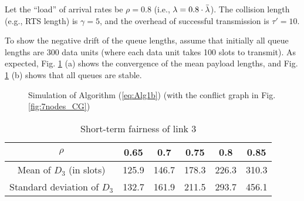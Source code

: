 \documentclass{IEEEtran}
\providecommand{\tabularnewline}{\\}
\begin{document}
Let the {}``load'' of arrival rates be $\rho=0.8$ (i.e., ${\bf \lambda}=0.8\cdot\bar{{\bf \lambda}}$).
The collision length (e.g., RTS length) is $\gamma=5$, and the overhead
of successful transmission is $\tau'=10$. \begin{comment}
It can be verified that ${\bf \lambda}\in{\cal C}'([r_{min},r_{max}],\epsilon)$. 
\end{comment}
{}To show the negative drift of the queue lengths, assume that initially
all queue lengths are 300 data units (where each data unit takes 100
slots to transmit). As expected, Fig. \ref{fig:Alg1} (a) shows the
convergence of the mean payload lengths, and Fig. \ref{fig:Alg1}
(b) shows that all queues are stable. \begin{figure}
\begin{centering}
\par\end{centering}

\begin{centering}
\par\end{centering}

\caption{\label{fig:Alg1}Simulation of Algorithm (\ref{eq:Alg1b}) (with the
conflict graph in Fig. \ref{fig:7nodes_CG})}

\end{figure}
\begin{table}
\begin{centering}
\begin{tabular}{|c|c|c|c|c|c|}
\hline 
$\rho$ & 0.65 & 0.7 & 0.75 & 0.8 & 0.85\tabularnewline
\hline
\hline 
Mean of $D_{3}$ (in slots) & 125.9 & 146.7 & 178.3 & 226.3 & 310.3\tabularnewline
\hline 
Standard deviation of $D_{3}$ & 132.7 & 161.9 & 211.5 & 293.7 & 456.1\tabularnewline
\hline
\end{tabular}
\par\end{centering}

\caption{\label{tab:st}Short-term fairness of link 3}

\end{table}
\end{document}
